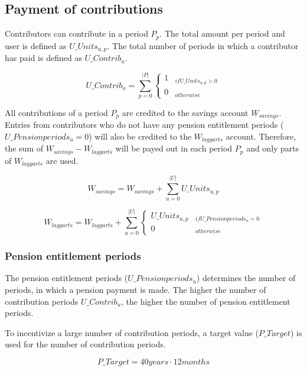 \subsection{Payment of contributions}

Contributors can contribute in a period $P_{p}$. The total amount per period and user is defined as $U\_Units_{u,p}$. The total number of periods in which a contributor has paid is defined as $U\_Contrib_{u}$.

\begin{equation}
U\_Contrib_{u} = \sum_{p=0}^{|P|} \begin{cases} 
1 & _{if U\_Units_{u,p} > 0} \\
0 & _{otherwise}
\end{cases}
\end{equation}


All contributions of a period $P_{p}$ are credited to the savings account $W_{savings}$.
Entries from contributors who do not have any pension entitlement periods ($U\_Pensionperiods_{u} = 0$) will also be credited to the $W_{laggarts}$ account. Therefore, the sum of $W_{savings}-W_{laggarts}$ will be payed out in each period $P_{p}$ and only parts of $W_{laggarts}$ are used.


\begin{equation}
W_{savings} = W_{savings} + \sum_{u=0}^{|U|} U\_Units_{u,p}
\end{equation}


\begin{dmath}
W_{laggarts} = W_{laggarts} + \sum_{u=0}^{|U|} \begin{cases} 
U\_Units_{u,p} & _{if U\_Pensionperiods_{u} = 0} \\
0 & _{otherwise}
\end{cases}
\end{dmath}

\subsubsection{Pension entitlement periods}
The pension entitlement periods ($U\_Pensionperiods_{u}$) determines the number of periods, in which a pension payment is made. The higher the number of contribution periods
$U\_Contrib_{u}$, the higher the number of pension entitlement periods.

To incentivize a large number of contribution periods, a target value ($P\_Target$) is used
for the number of contribution periods. 

\begin{equation}
	P\_Target = 40 years \cdot 12 months
\end{equation}

